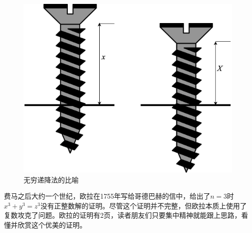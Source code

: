 \documentclass[b5paper]{ctexart}
\begin{document}
\begin{figure}[htbp]
 \centering
 \includegraphics[scale=0.3]{img/infinite-descent}
 \caption{无穷递降法的比喻}
 \label{fig:infinite-descent}
\end{figure}

费马之后大约一个世纪，欧拉在1755年写给哥德巴赫的信中，给出了$n = 3$时$x^3 + y^3 = z^3$没有正整数解的证明。尽管这个证明并不完整，但欧拉本质上使用了复数攻克了问题。欧拉的证明有2页，读者朋友们只要集中精神就能跟上思路，看懂并欣赏这个优美的证明。
\end{document}
